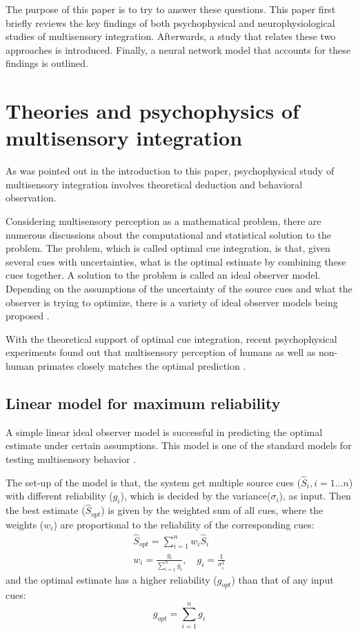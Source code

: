 \documentclass{article}[11pt]
\begin{document}
The purpose of this paper is to try to answer these questions. This paper first briefly reviews the key findings of both psychophysical and neurophysiological studies of multisensory integration. Afterwards, a study that relates these two approaches is introduced. Finally, a neural network model that accounts for these findings is outlined.

\section{Theories and psychophysics of multisensory integration}
As was pointed out in the introduction to this paper, psychophysical study of multisensory integration involves theoretical deduction and behavioral observation.

Considering multisensory perception as a mathematical problem, there are numerous discussions about the computational and statistical solution to the problem. The problem, which is called optimal cue integration, is that, given several cues with uncertainties, what is the optimal estimate by combining these cues together. A solution to the problem is called an ideal observer model. Depending on the assumptions of the uncertainty of the source cues and what the observer is trying to optimize, there is a variety of ideal observer models being proposed \cite{landy_ideal-observer_2011}.

With the theoretical support of optimal cue integration, recent psychophysical experiments found out that multisensory perception of humans as well as non-human primates closely matches the optimal prediction \cite{ernst_humans_2002,alais_ventriloquist_2004,gu_neural_2008}.

\subsection{Linear model for maximum reliability}
A simple linear ideal observer model is successful in predicting the optimal estimate under certain assumptions. This model is one of the standard models for testing multisensory behavior \cite{landy_ideal-observer_2011}.

The set-up of the model is that, the system get multiple source cues ($\hat{S}_i, i=1 \dots n$) with different reliability ($g_i$), which is decided by the variance($\sigma_i$), as input. Then the best estimate ($\hat{S}_{opt}$) is given by the weighted sum of all cues, where the weights ($w_i$) are proportional to the reliability of the corresponding cues:
\begin{gather}
  \hat{S}_{opt} = \sum_{i=1}^{n} w_i \hat{S}_i \label{eq:optest} \\
  w_i = \frac{g_i}{\sum_{i=1}^{n} g_i}, \quad g_i = \frac{1}{\sigma_i^2} \label{eq:optweight}
\end{gather}
and the optimal estimate has a higher reliability ($g_{opt}$) than that of any input cues:
\begin{equation}
  g_{opt} = \sum_{i=1}^{n} g_i \label{eq:optrel}
\end{equation}
\end{document}
